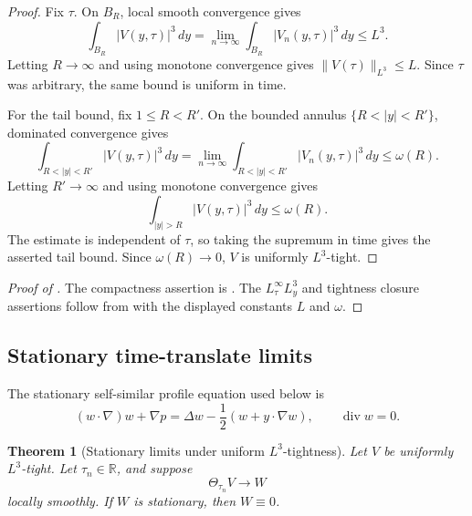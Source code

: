 \documentclass[11pt]{amsart}
\theoremstyle{plain}
\newtheorem{theorem}{Theorem}[section]
\theoremstyle{definition}
\theoremstyle{remark}
\numberwithin{equation}{section}
\newcommand{\R}{\mathbb R}
\newcommand{\divergence}{\operatorname{div}}
\begin{document}
\begin{proof}
Fix \(\tau\).  On \(B_R\), local smooth convergence gives
\[
   \int_{B_R}|V(y,\tau)|^3\,dy
   =
   \lim_{n\to\infty}\int_{B_R}|V_n(y,\tau)|^3\,dy
   \le L^3 .
\]
Letting \(R\to\infty\) and using monotone convergence gives
\(\|V(\tau)\|_{L^3}\le L\).  Since \(\tau\) was arbitrary, the same bound is
uniform in time.

For the tail bound, fix \(1\le R<R'\).  On the bounded annulus
\(\{R<|y|<R'\}\), dominated convergence gives
\[
   \int_{R<|y|<R'}|V(y,\tau)|^3\,dy
   =
   \lim_{n\to\infty}
   \int_{R<|y|<R'}|V_n(y,\tau)|^3\,dy
   \le \omega(R).
\]
Letting \(R'\to\infty\) and using monotone convergence gives
\[
   \int_{|y|>R}|V(y,\tau)|^3\,dy\le \omega(R).
\]
The estimate is independent of \(\tau\), so taking the supremum in time gives
the asserted tail bound.  Since \(\omega(R)\to0\), \(V\) is uniformly
\(L^3\)-tight.
\end{proof}

\begin{proof}[Proof of ]
The compactness assertion is .  The
\(L^\infty_\tau L^3_y\) and tightness closure assertions follow from
 with the displayed constants \(L\) and \(\omega\).
\end{proof}

\subsection{Stationary time-translate limits}

The stationary self-similar profile equation used below is
\begin{equation}\label{eq:stationary-profile}
   (w\cdot\nabla)w+\nabla p
   =
   \Delta w-\frac12(w+y\cdot\nabla w),
   \qquad \divergence w=0 .
\end{equation}

\begin{theorem}[Stationary limits under uniform \(L^3\)-tightness]
\label{thm:stationary-limits-tight}
Let \(V\) be uniformly \(L^3\)-tight.  Let \(\tau_n\in\R\), and suppose
\[
   \Theta_{\tau_n}V\to W
\]
locally smoothly.  If \(W\) is stationary, then \(W\equiv0\).
\end{theorem}
\end{document}
